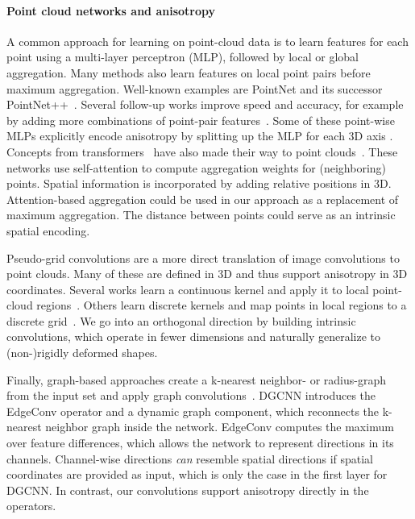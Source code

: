 \documentclass[acmtog, authorversion]{acmart}
\begin{document}
\paragraph*{Point cloud networks and anisotropy}
A common approach for learning on point-cloud data is to learn features for each point using a multi-layer perceptron (MLP), followed by local or global aggregation. Many methods also learn features on local point pairs before maximum aggregation.
Well-known examples are PointNet and its successor PointNet++~\cite{Qi2017a, Qi2017b}. Several follow-up works improve speed and accuracy, for example by adding more combinations of point-pair features~\cite{Zhao_2019_CVPR, Sun2019, Yang2019ModelingPC, Le_2020_CVPR, closerlook, drnet, gdanet, cganet}. Some of these point-wise MLPs explicitly encode anisotropy by splitting up the MLP for each 3D axis \cite{Lan2019ModelingLG, closerlook}. Concepts from transformers~\cite{vaswani2017attention} have also made their way to point clouds~\cite{pointtransformer, pointvoxeltransformer, lin2020onepoint}. These networks use self-attention to compute aggregation weights for (neighboring) points. Spatial information is incorporated by adding relative positions in 3D. Attention-based aggregation could be used in our approach as a replacement of maximum aggregation. The distance between points could serve as an intrinsic spatial encoding.

Pseudo-grid convolutions are a more direct translation of image convolutions to point clouds. Many of these are defined in 3D and thus support anisotropy in 3D coordinates. Several works learn a continuous kernel and apply it to local point-cloud regions~\cite{liu2019rscnn, Boulch2019ConvPoint, Densepoint2019, thomas2019KPConv, Wu_2019_CVPR, Hermosilla2018, Matan2018,Fey2018, paconv}. Others learn discrete kernels and map points in local regions to a discrete grid~\cite{Hua2018, lei2019octree, li2018pointcnn, minkowskinet, SparseConvNet}. We go into an orthogonal direction by building intrinsic convolutions, which operate in fewer dimensions and naturally generalize to (non-)rigidly deformed shapes.

Finally, graph-based approaches create a k-nearest neighbor- or radius-graph from the input set and apply graph convolutions~\cite{Simonovsky2017, Wang2019, Zhang2019, Liu2019DPAM, Shen2018, Dominguez2018, Chen_2020_CVPR, Rgcnn, Feng2019HGNN, Wang2018a, Zhang2018, Pan2018}. DGCNN \cite{Wang2019} introduces the EdgeConv operator and a dynamic graph component, which reconnects the k-nearest neighbor graph inside the network. EdgeConv computes the maximum over feature differences, which allows the network to represent directions in its channels. Channel-wise directions \textit{can} resemble spatial directions if spatial coordinates are provided as input, which is only the case in the first layer for DGCNN. In contrast, our convolutions support anisotropy directly in the operators.
\end{document}
